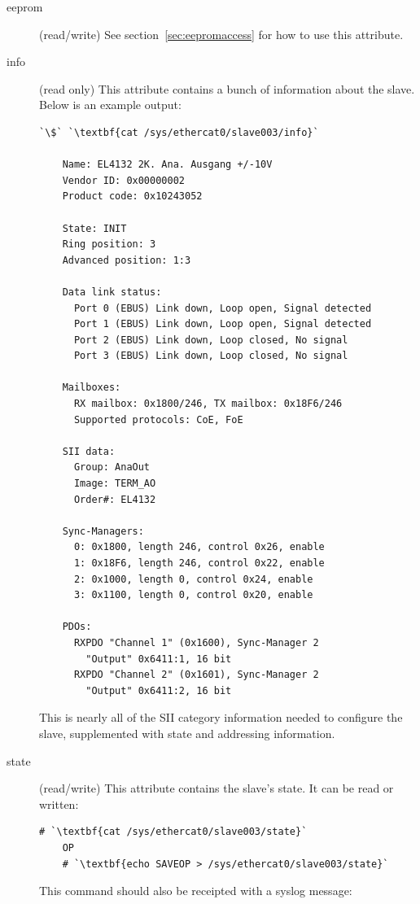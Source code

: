 \documentclass[a4paper,12pt,BCOR6mm,bibtotoc,idxtotoc]{scrbook}
\begin{document}
\begin{description}
\item[eeprom] (read/write) See section~\ref{sec:eepromaccess} for how
  to use this attribute.

\item[info] (read only) This attribute contains a bunch of information
  about the slave. Below is an example output:

  \begin{lstlisting}[gobble=4]
    `\$` `\textbf{cat /sys/ethercat0/slave003/info}`

    Name: EL4132 2K. Ana. Ausgang +/-10V
    Vendor ID: 0x00000002
    Product code: 0x10243052

    State: INIT
    Ring position: 3
    Advanced position: 1:3

    Data link status:
      Port 0 (EBUS) Link down, Loop open, Signal detected
      Port 1 (EBUS) Link down, Loop open, Signal detected
      Port 2 (EBUS) Link down, Loop closed, No signal
      Port 3 (EBUS) Link down, Loop closed, No signal

    Mailboxes:
      RX mailbox: 0x1800/246, TX mailbox: 0x18F6/246
      Supported protocols: CoE, FoE

    SII data:
      Group: AnaOut
      Image: TERM_AO
      Order#: EL4132

    Sync-Managers:
      0: 0x1800, length 246, control 0x26, enable
      1: 0x18F6, length 246, control 0x22, enable
      2: 0x1000, length 0, control 0x24, enable
      3: 0x1100, length 0, control 0x20, enable

    PDOs:
      RXPDO "Channel 1" (0x1600), Sync-Manager 2
        "Output" 0x6411:1, 16 bit
      RXPDO "Channel 2" (0x1601), Sync-Manager 2
        "Output" 0x6411:2, 16 bit
  \end{lstlisting}

  This is nearly all of the SII category information needed to
  configure the slave, supplemented with state and addressing
  information.

\item[state] (read/write) This attribute contains the slave's state.
  It can be read or written:

  \begin{lstlisting}[gobble=4]
    # `\textbf{cat /sys/ethercat0/slave003/state}`
    OP
    # `\textbf{echo SAVEOP > /sys/ethercat0/slave003/state}`
  \end{lstlisting}

  This command should also be receipted with a syslog message:


\end{description}
\end{document}
